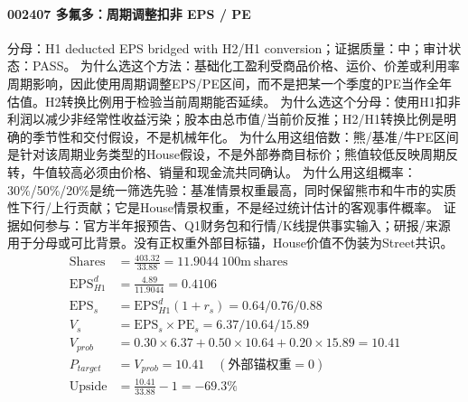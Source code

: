 \paragraph{002407 多氟多：周期调整扣非 EPS / PE}
分母：H1 deducted EPS bridged with H2/H1 conversion；证据质量：中；审计状态：PASS。
为什么选这个方法：基础化工盈利受商品价格、运价、价差或利用率周期影响，因此使用周期调整EPS/PE区间，而不是把某一个季度的PE当作全年估值。H2转换比例用于检验当前周期能否延续。
为什么选这个分母：使用H1扣非利润以减少非经常性收益污染；股本由总市值/当前价反推；H2/H1转换比例是明确的季节性和交付假设，不是机械年化。
为什么用这组倍数：熊/基准/牛PE区间是针对该周期业务类型的House假设，不是外部券商目标价；熊值较低反映周期反转，牛值较高必须由价格、销量和现金流共同确认。
为什么用这组概率：30\%/50\%/20\%是统一筛选先验：基准情景权重最高，同时保留熊市和牛市的实质性下行/上行贡献；它是House情景权重，不是经过统计估计的客观事件概率。
证据如何参与：官方半年报预告、Q1财务包和行情/K线提供事实输入；研报/来源用于分母或可比背景。没有正权重外部目标锚，House价值不伪装为Street共识。
\begin{align*}
\mathrm{Shares} &= \frac{403.32}{33.88}=11.9044\ \mathrm{100m\ shares}\\
\mathrm{EPS}_{H1}^d &= \frac{4.89}{11.9044}=0.4106\\
\mathrm{EPS}_s &= \mathrm{EPS}_{H1}^d(1+r_s)=0.64/0.76/0.88\\
V_s &= \mathrm{EPS}_s\times \mathrm{PE}_s=6.37/10.64/15.89\\
V_{prob} &= 0.30\times 6.37+0.50\times 10.64+0.20\times 15.89=10.41\\
P_{target} &= V_{prob}=10.41\quad(\text{外部锚权重}=0)\\
\mathrm{Upside} &= \frac{10.41}{33.88}-1=-69.3\%\\
\end{align*}

